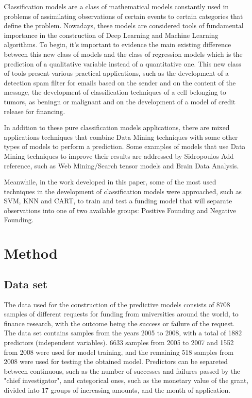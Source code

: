 \documentclass[conference]{IEEEtran}
\newcommand{\reviewNormal}[1]{{\color{yellow} #1}} %
\begin{document}
Classification models are a class of mathematical models constantly used in problems of
assimilating observations of certain events to certain categories that define the problem.
Nowadays, these models are considered tools of fundamental importance in the construction 
of Deep Learning and Machine Learning algorithms. To begin, it's important to evidence 
the main existing difference between this new class of models and the class of 
regression models which is the prediction of a qualitative variable instead of a quantitative
one. This new class of tools present various practical applications, such as the 
development of a detection spam filter for emails based on the sender and on the content
of the message, the development of classification techniques of a cell belonging to tumors, 
as beningn or malignant and on the development of a model of credit release for financing.

In addition to these pure classification models applications, there are mixed applications 
techniques that combine Data Mining techniques with some other types of models to perform
a prediction. Some examples of models that use Data Mining techniques to improve their 
results are addressed by Sidropoulos \reviewNormal{Add reference}, such as Web Mining/Search 
tensor models and Brain Data Analysis. 

Meanwhile, in the work developed in this paper, some of the most used techniques in the
development of classification models were approached, such as SVM, KNN and CART, to train and 
test a funding model that will separate observations into one of two available groups:
Positive Founding and Negative Founding.


\section{Method}

\subsection{Data set}

The data used for the construction of the predictive models consists of 8708 samples
of different requests for funding from universities around the world, to finance research,
with the outcome being the success or failure of the request. The data set contains samples
from the years 2005 to 2008, with a total of 1882 predictors (independent variables). 
6633 samples from 2005 to 2007 and 1552 from 2008 were used for model training, and the 
remaining 518 samples from 2008 were used for testing the obtained model. Predictors can be 
separeted between continuous, such as the number of successes and failures passed by the 
"chief investigator", and categorical ones, such as the monetary value of the grant, 
divided into 17 groups of increasing amounts, and the month of application.
\end{document}
